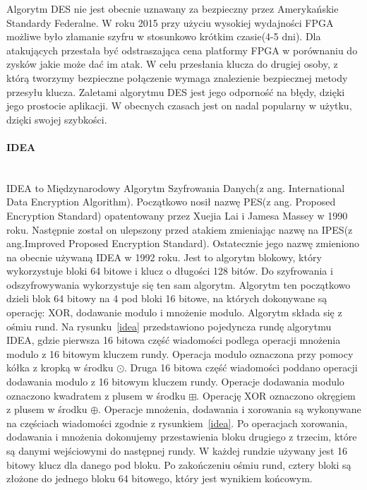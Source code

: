 \documentclass[12p]{article}
\begin{document}
Algorytm DES nie jest obecnie uznawany za bezpieczny przez Amerykańskie Standardy Federalne. W roku 2015 przy użyciu wysokiej wydajności FPGA możliwe było złamanie szyfru w stosunkowo krótkim czasie(4-5 dni). Dla atakujących przestała być odstraszająca cena platformy FPGA w porównaniu do zysków jakie może dać im atak. W celu przesłania klucza do drugiej osoby, z którą tworzymy bezpieczne połączenie wymaga znalezienie bezpiecznej metody przesyłu klucza. Zaletami algorytmu DES jest jego odporność na błędy, dzięki jego prostocie aplikacji. W obecnych czasach jest on nadal popularny w użytku, dzięki swojej szybkości.~\cite{DES}




\paragraph{IDEA} \mbox{} \\ 

IDEA to Międzynarodowy Algorytm Szyfrowania Danych(z ang. International Data Encryption Algorithm). Początkowo nosił nazwę PES(z ang. Proposed Encryption Standard) opatentowany przez Xuejia Lai i Jamesa Massey w 1990 roku. Następnie został on ulepszony przed atakiem zmieniając nazwę na IPES(z ang.Improved Proposed Encryption Standard). Ostatecznie jego nazwę zmieniono na obecnie używaną IDEA w 1992 roku. Jest to algorytm blokowy, który wykorzystuje bloki 64 bitowe i klucz o długości 128 bitów. Do szyfrowania i odszyfrowywania wykorzystuje się ten sam algorytm. Algorytm ten początkowo dzieli blok 64 bitowy na 4 pod bloki 16 bitowe, na których dokonywane są operację: XOR, dodawanie modulo i mnożenie modulo. Algorytm składa się z ośmiu rund. Na rysunku~\ref{idea} przedstawiono pojedyncza rundę algorytmu IDEA, gdzie pierwsza 16 bitowa część wiadomości podlega operacji mnożenia modulo z 16 bitowym kluczem rundy. Operacja modulo oznaczona przy pomocy kółka z kropką w środku $\odot$. Druga 16 bitowa część wiadomości poddano operacji dodawania modulo z 16 bitowym kluczem rundy. Operacje dodawania modulo oznaczono kwadratem z plusem w środku $\boxplus$. Operację XOR oznaczono okręgiem z plusem w środku $\oplus$. Operacje mnożenia, dodawania i xorowania są wykonywane na częściach wiadomości zgodnie z rysunkiem~\ref{idea}. Po operacjach xorowania, dodawania i mnożenia dokonujemy przestawienia bloku drugiego z trzecim, które są danymi wejściowymi do następnej rundy. W każdej rundzie używany jest 16 bitowy klucz dla danego pod bloku. Po zakończeniu ośmiu rund, cztery bloki są złożone do jednego bloku 64 bitowego, który jest wynikiem końcowym.
\end{document}
